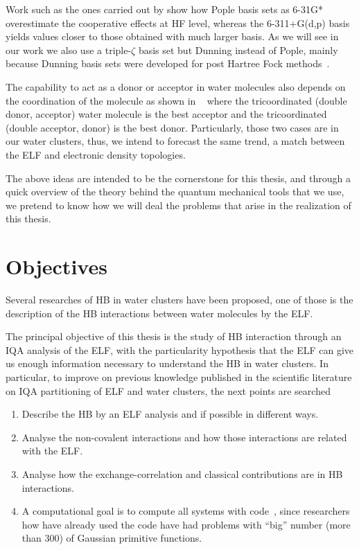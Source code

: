 Work such as the ones carried out by \citet{M1992} show how Pople basis sets as
6-31G* overestimate the cooperative effects at HF level, whereas the
6-311+G(d,p) basis yields values closer to those obtained with much larger
basis.  As we will see in our work we also use a triple-$\zeta$ basis set but
Dunning instead of Pople, mainly because Dunning basis sets were developed for
post Hartree Fock methods~\cite{Dunning1989}.

The capability to act as a donor or acceptor in water molecules also depends on
the coordination of the molecule as shown in ~\citet{Toche2016, Castor2020}
where the tricoordinated (double donor, acceptor) water molecule is the best
acceptor and the tricoordinated (double acceptor, donor) is the best donor.
Particularly, those two cases are in our water clusters, thus, we intend to
forecast the same trend, a match between the ELF and electronic density topologies.

The above ideas are intended to be the cornerstone for this thesis, and through
a quick overview of the theory behind the quantum mechanical tools that we use,
we pretend to know how we will deal the problems that arise in
the realization of this thesis.

\chapter{Objectives}

Several researches of HB in water clusters have been proposed, one of those is
the description of the HB interactions between water molecules by the
\gls{ELF}.

The principal objective of this thesis is the study of HB interaction through
an IQA analysis of the ELF, with the particularity hypothesis that the ELF can
give us enough information necessary to understand the HB in water clusters. In
particular, to improve on previous knowledge published in the scientific
literature on IQA partitioning of ELF and water clusters, the next points are
searched

\begin{enumerate}

\item Describe the HB by an ELF analysis and if possible in different ways.

\item Analyse the non-covalent interactions and how those interactions
are related with the ELF.

\item Analyse how the exchange-correlation and classical contributions are in
HB interactions.

\item A computational goal is to compute all systems with {}
code~\cite{promolden},
since researchers how have already used the code have had problems with
``big'' number (more than 300) of Gaussian primitive functions.

\end{enumerate}
